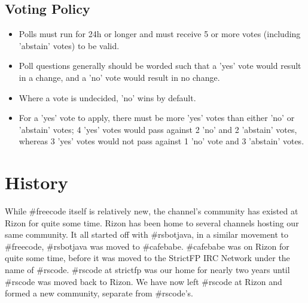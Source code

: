 \documentclass[11pt,a4paper,notitlepage]{article}
\begin{document}
\subsection{Voting Policy}
\begin{itemize}
\item Polls must run for 24h or longer and must receive 5 or more votes (including 'abstain' votes) to be valid.
\item Poll questions generally should be worded such that a 'yes' vote would result in a change, and a 'no' vote would result in no change.
\item Where a vote is undecided, 'no' wins by default.
\item For a 'yes' vote to apply, there must be more 'yes' votes than either 'no' or 'abstain' votes; 4 'yes' votes would pass against 2 'no' and 2 'abstain' votes, whereas 3 'yes' votes would not pass against 1 'no' vote and 3 'abstain' votes.
\end{itemize}

\section{History}
While \#freecode itself is relatively new, the channel's community has existed at Rizon for quite some time.
Rizon has been home to several channels hosting our same community.
It all started off with \#rsbotjava, in a similar movement to \#freecode, \#rsbotjava was moved to \#cafebabe.
\#cafebabe was on Rizon for quite some time, before it was moved to the StrictFP IRC Network under the name of \#rscode.
\#rscode at strictfp was our home for nearly two years until \#rscode was moved back to Rizon.
We have now left \#rscode at Rizon and formed a new community, separate from \#rscode's.
\end{document}
